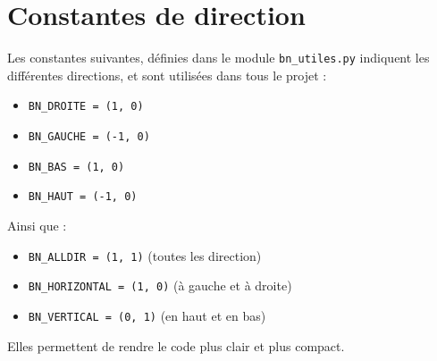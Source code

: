 \section{Constantes de direction}
Les constantes suivantes, définies dans le module \texttt{bn\_utiles.py} indiquent les différentes directions, et sont utilisées dans tous le projet :
\begin{itemize}
\item \texttt{BN\_DROITE = (1, 0)}
\item \texttt{BN\_GAUCHE = (-1, 0)}
\item \texttt{BN\_BAS = (1, 0)}
\item \texttt{BN\_HAUT = (-1, 0)}
\end{itemize}
Ainsi que :
\begin{itemize}
\item \texttt{BN\_ALLDIR = (1, 1)} (toutes les direction)
\item \texttt{BN\_HORIZONTAL = (1, 0)} (à gauche et à droite)
\item \texttt{BN\_VERTICAL = (0, 1)} (en haut et en bas)
\end{itemize}
Elles permettent de rendre le code plus clair et plus compact.